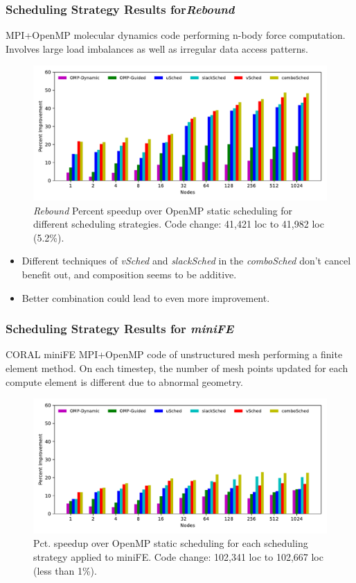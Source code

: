 \begin{frame}[label=combinednbody]
\frametitle{Scheduling Strategy Results for\textit{Rebound}}
{\tiny MPI+OpenMP molecular dynamics code performing n-body force
computation. Involves large load imbalances as well as irregular data
access patterns.}
\begin{figure}
\includegraphics[scale=0.38]{./plots/app-scaling-strat-nbody-fastNUMA2}
\caption{\tiny \textit{Rebound} Percent speedup over OpenMP static
  scheduling for
  different scheduling strategies. Code change: 41,421 loc to 41,982
  loc (5.2\%).}
\end{figure}
\begin{itemize}
\tiny \item \tiny Different techniques of \textit{vSched} and
\textit{slackSched} in the \textit{comboSched} don't cancel benefit
out, and composition seems to be additive.
\item \tiny Better combination could lead to even more improvement.
\end{itemize}
\end{frame}

\begin{frame}[label=combinedfe]
\frametitle{Scheduling Strategy Results for \textit{miniFE}}

{\tiny CORAL miniFE MPI+OpenMP code of unstructured mesh performing a finite element method. On each timestep, the number of mesh points updated for each compute element is different due to abnormal geometry.}
\begin{figure}[ht!]
\includegraphics[scale=0.38]{./plots/app-scaling-strat-fe-fastNUMA2}
\caption{\tiny Pct. speedup over OpenMP static scheduling for each
scheduling strategy applied to miniFE. Code change: 102,341 loc to 102,667 loc (less than 1\%).}
\end{figure}
\vspace*{-0.2in}
\end{frame}

